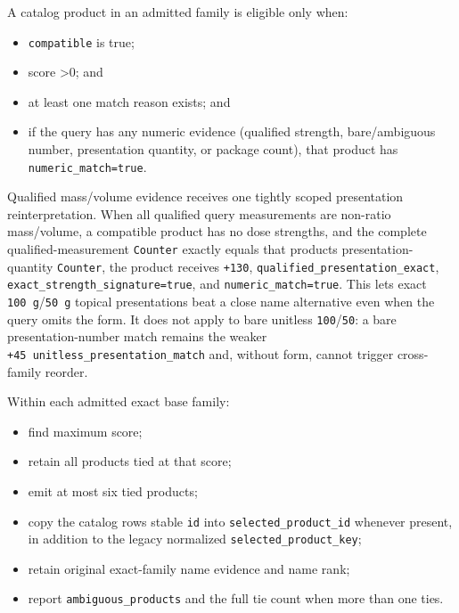 A catalog product in an admitted family is eligible only when:

\begin{itemize}
\tightlist
\item
  \texttt{compatible} is true;
\item
  score \textgreater0; and
\item
  at least one match reason exists; and
\item
  if the query has any numeric evidence (qualified strength, bare/ambiguous number, presentation quantity, or package count), that product has \texttt{numeric\_\allowbreak{}match=true}.
\end{itemize}

Qualified mass/volume evidence receives one tightly scoped presentation reinterpretation. When all qualified query measurements are non-ratio mass/volume, a compatible product has no dose strengths, and the complete qualified-measurement \texttt{Counter} exactly equals that product\textquotesingle s presentation-quantity \texttt{Counter}, the product receives \texttt{+130}, \texttt{qualified\_\allowbreak{}presentation\_\allowbreak{}exact}, \texttt{exact\_\allowbreak{}strength\_\allowbreak{}signature=true}, and \texttt{numeric\_\allowbreak{}match=true}. This lets exact \texttt{100\ g}/\texttt{50\ g} topical presentations beat a close name alternative even when the query omits the form. It does not apply to bare unitless \texttt{100}/\texttt{50}: a bare presentation-number match remains the weaker \texttt{+45\ unitless\_\allowbreak{}presentation\_\allowbreak{}match} and, without form, cannot trigger cross-family reorder.

Within each admitted exact base family:

\begin{itemize}
\tightlist
\item
  find maximum score;
\item
  retain all products tied at that score;
\item
  emit at most six tied products;
\item
  copy the catalog row\textquotesingle s stable \texttt{id} into \texttt{selected\_\allowbreak{}product\_\allowbreak{}id} whenever present, in addition to the legacy normalized \texttt{selected\_\allowbreak{}product\_\allowbreak{}key};
\item
  retain original exact-family name evidence and name rank;
\item
  report \texttt{ambiguous\_\allowbreak{}products} and the full tie count when more than one ties.
\end{itemize}

